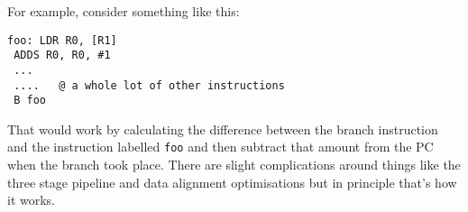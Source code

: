 For example, consider something like this:
\begin{lstlisting}[fontadjust=true,frame=trBL]
foo: LDR R0, [R1]
 ADDS R0, R0, #1
 ...
 ....   @ a whole lot of other instructions
 B foo
\end{lstlisting}
That would work by calculating the difference between the branch instruction and the instruction labelled \texttt{foo} and then subtract that amount from the PC when the branch took place. There are slight complications around things like the three stage pipeline and data alignment optimisations but in principle that's how it works. 
